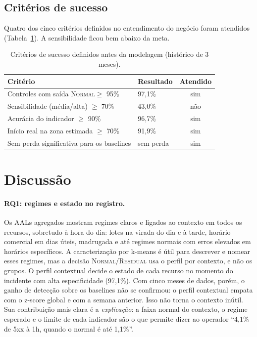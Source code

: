 \documentclass[sigconf,nonacm]{acmart}
\newcommand{\Normal}{\textsc{Normal}\xspace}
\newcommand{\Residual}{\textsc{Residual}\xspace}
\begin{document}
\subsection{Critérios de sucesso}
Quatro dos cinco critérios definidos no entendimento do negócio foram atendidos (Tabela~\ref{tab:criterios}). A sensibilidade ficou bem abaixo da meta.

\begin{table}[t]
  \caption{Critérios de sucesso definidos antes da modelagem (histórico de 3 meses).}
  \label{tab:criterios}
  \small
  \begin{tabular}{p{}p{}c}
    \toprule
    Critério & Resultado & Atendido \\
    \midrule
    Controles com saída \Normal $\geq$ 95\% & 97,1\% & sim \\
    Sensibilidade (média/alta) $\geq$ 70\% & 43,0\% & não \\
    Acurácia do indicador $\geq$ 90\% & 96,7\% & sim \\
    Início real na zona estimada $\geq$ 70\% & 91,9\% & sim \\
    Sem perda significativa para os baselines & sem perda & sim \\
    \bottomrule
  \end{tabular}
\end{table}

\section{Discussão}\label{sec:discussao}

\paragraph{RQ1: regimes e estado no registro.} Os AALs agregados mostram regimes claros e ligados ao contexto em todos os recursos, sobretudo à hora do dia: lotes na virada do dia e à tarde, horário comercial em dias úteis, madrugada e até regimes normais com erros elevados em horários específicos. A caracterização por k-means é útil para descrever e nomear esses regimes, mas a decisão \Normal/\Residual usa o perfil por contexto, e não os grupos. O perfil contextual decide o estado de cada recurso no momento do incidente com alta especificidade (97,1\%). Com cinco meses de dados, porém, o ganho de detecção sobre os baselines não se confirmou: o perfil contextual empata com o z-score global e com a semana anterior. Isso não torna o contexto inútil. Sua contribuição mais clara é a \emph{explicação}: a faixa normal do contexto, o regime esperado e o limite de cada indicador são o que permite dizer ao operador ``4,1\% de 5xx à 1h, quando o normal é até 1,1\%''.
\end{document}
